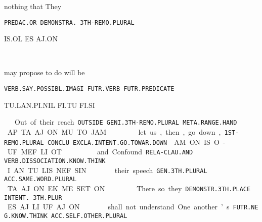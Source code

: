 {{nothing 	that		They 	 

{\tt PREDAC.OR	DEMONSTRA.	3TH-REMO.PLURAL }

IS.OL		ES		AJ.ON	 

\is\ol~\es~\aj\on
\drie 

 

may propose			to do		will be 

{\tt VERB.SAY.POSSIBL.IMAGI	FUTR.VERB	FUTR.PREDICATE }

TU.LAN.PI.NIL		               FI.TU		FI.SI 

\tu\lan\Atlanpi\Atlannil~\Atlanfi\tu~\Atlanfi\si
\drie 

  

Out 		of their 				reach 

{\tt OUTSIDE	GENI.3TH-REMO.PLURAL	META.RANGE.HAND }

AP		TA.AJ.ON			MU.TO.JAM 

\ap~\ta\aj\on~\Atlanmu\Atlanto\jam
\drie

  

let us, then, go down, 			      	 

{\tt 1ST-REMO.PLURAL CONCLU EXCLA.INTENT.GO.TOWAR.DOWN             }

AM.ON	IS	 O-UF.MEF.LI.OT				 

\am\on~\is~\Atlano\uf\mef\li\ot
\drie
 

and  			Confound 

{\tt RELA-CLAU.AND	VERB.DISSOCIATION.KNOW.THINK }

I.AN			TU.LIS.NEF.SIN      

\Atlani\an~\tu\lis\nef\Atlansin
\drie

  

their 			speech

{\tt GEN.3TH.PLURAL             ACC.SAME.WORD.PLURAL	 	}

TA.AJ.ON		EK.ME.SET.ON 

\ta\aj\on~\ek\me\set\on

\drie

  

There			so 			they 		

{\tt DEMONSTR.3TH.PLACE        INTENT.		3TH.PLUR	 }

ES.AJ.LI				UF		AJ.ON				 

\es\aj\li~\uf~\aj\on

\drie


shall not understand 		One another’s 

{\tt FUTR.NEG.KNOW.THINK		ACC.SELF.OTHER.PLURAL }

}}
